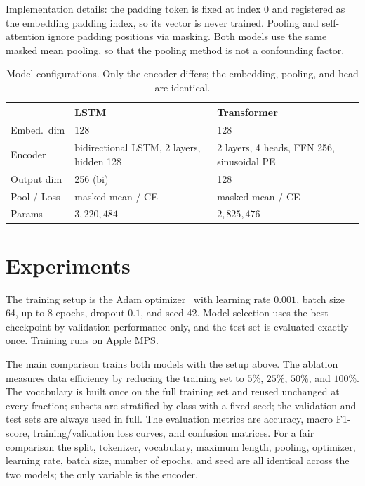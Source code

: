 \documentclass[10pt,twocolumn,letterpaper]{article}
\begin{document}
Implementation details: the padding token is fixed at index 0 and registered
as the embedding padding index, so its vector is never trained. Pooling and
self-attention ignore padding positions via masking. Both models use the same
masked mean pooling, so that the pooling method is not a confounding factor.

\begin{table}[t]
\centering\small
\setlength{\tabcolsep}{4pt}
\begin{tabularx}{\columnwidth}{lXX}
\toprule
 & LSTM & Transformer \\
\midrule
Embed.\ dim & 128 & 128 \\
Encoder & bidirectional LSTM, 2 layers, hidden 128 & 2 layers, 4 heads, FFN 256, sinusoidal PE \\
Output dim & 256 (bi) & 128 \\
Pool / Loss & masked mean / CE & masked mean / CE \\
Params & $3{,}220{,}484$ & $2{,}825{,}476$ \\
\bottomrule
\end{tabularx}
\caption{Model configurations. Only the encoder differs; the embedding,
pooling, and head are identical.}
\label{tab:models}
\end{table}

\section{Experiments}
The training setup is the Adam optimizer~\cite{kingma2015adam} with learning
rate $0.001$, batch size 64, up to 8 epochs, dropout $0.1$, and seed 42. Model
selection uses the best checkpoint by validation performance only, and the
test set is evaluated exactly once. Training runs on Apple MPS.

The main comparison trains both models with the setup above. The ablation
measures data efficiency by reducing the training set to $5\%$, $25\%$, $50\%$,
and $100\%$. The vocabulary is built once on the full training set and reused
unchanged at every fraction; subsets are stratified by class with a fixed
seed; the validation and test sets are always used in full. The evaluation
metrics are accuracy, macro F1-score, training/validation loss curves, and
confusion matrices. For a fair comparison the split, tokenizer, vocabulary,
maximum length, pooling, optimizer, learning rate, batch size, number of
epochs, and seed are all identical across the two models; the only variable is
the encoder.
\end{document}
